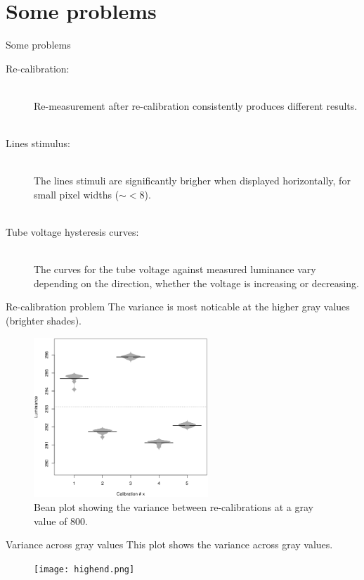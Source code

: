 \documentclass{beamer}
\begin{document}
\section{Some problems}
\begin{frame}[t]{Some problems}
\begin{description}
\item[Re-calibration:] ~\\Re-measurement after re-calibration consistently produces different results.\\
~\\

\item[Lines stimulus:] ~\\The lines stimuli are significantly brigher when displayed horizontally, for small pixel widths ($\sim <8$).\\
~\\
\item [Tube voltage hysteresis curves:] ~\\The curves for the tube voltage against measured luminance vary depending on the direction, whether the voltage is increasing or decreasing.
\end{description}
\end{frame}

\begin{frame}[t]{Re-calibration problem}
The variance is most noticable at the higher gray values (brighter shades).

\begin{figure}[c]
\includegraphics[height=6cm]{cbeanplotmean_800_color.png}
\caption{Bean plot showing the variance between re-calibrations at a gray value of 800.}
\end{figure}
\end{frame}

\begin{frame}[t]{Variance across gray values}
This plot shows the variance across gray values.
\begin{figure}[c]
\texttt{[image: highend.png]}
\end{figure}
\end{frame}
\end{document}
